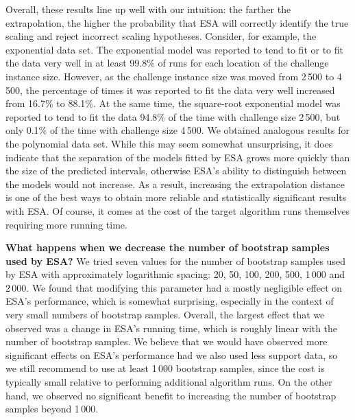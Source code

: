 \documentclass[aic]{iosart2x}
\begin{document}
Overall, these results line up well with our intuition: the farther the extrapolation, the higher the probability that ESA will correctly identify the true scaling and reject incorrect scaling hypotheses. 
Consider, for example, the exponential data set. The exponential model was reported to tend to fit or to fit the data very well in at least 99.8\% of runs for each location of the challenge instance size. 
However, as the challenge instance size was moved from 2\,500 to 4\,500, the percentage of times it was reported to fit the data very well increased from 16.7\% to 88.1\%. 
At the same time, the square-root exponential model was reported to tend to fit the data 94.8\% of the time with challenge size 2\,500, but only 0.1\% of the time with challenge size 4\,500. 
We obtained analogous results for the polynomial data set. 
While this may seem somewhat unsurprising, it does indicate that the separation of the models fitted by ESA grows more quickly than the size of the predicted intervals, otherwise ESA's ability to distinguish between the models would not increase. 
As a result, increasing the extrapolation distance is one of the best ways to obtain more reliable and statistically significant results with ESA. Of course, it comes at the cost of the target algorithm runs themselves requiring more running time. 

\textbf{What happens when we decrease the number of bootstrap samples used by ESA?}
We tried seven values for the number of bootstrap samples used by ESA with approximately logarithmic spacing: 20, 50, 100, 200, 500, 1\,000 and 2\,000. We found that modifying this parameter had a mostly negligible effect on ESA's performance, which is somewhat surprising, especially in the context of very small numbers of bootstrap samples. Overall, the largest effect that we observed was a change in ESA's running time, which is roughly linear with the number of bootstrap samples. 
We believe that we would have observed more significant effects on ESA's performance had we also used less support data, so we still recommend to use at least 1\,000 bootstrap samples, since the cost is typically small relative to performing additional algorithm runs. 
On the other hand, we observed no significant benefit to increasing the number of bootstrap samples beyond 1\,000.
\end{document}
